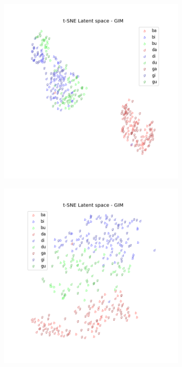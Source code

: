 		
		
		
		
		
	

			
			\begin{figure}[ht] %
				\centering
				\begin{subfigure}{0.45\linewidth}
					\centering
					\includegraphics[width=\linewidth]{"t-sne kld=0.0033 module 1"}
					\caption{}
					\label{fig:t-sne-kld33-module1}
				\end{subfigure}
				\hspace{0cm}
				\begin{subfigure}{0.45\linewidth}
					\centering
					\includegraphics[width=\linewidth]{"t-sne kld=0.0033 module 2"}

\end{subfigure}
\end{figure}
